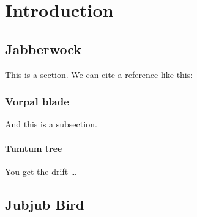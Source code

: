 \chapter{Introduction}
\section{Jabberwock}
This is a section. We can cite a reference like this: \cite{INTERNET} 	
\subsection{Vorpal blade}
And this is a subsection.
	
\subsubsection{Tumtum tree}
You get the drift \ldots
		
\section{Jubjub Bird}